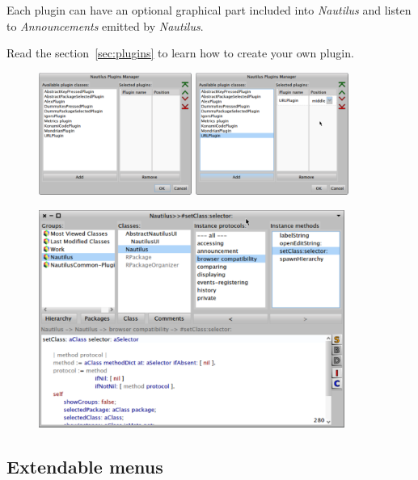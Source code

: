 \documentclass[a4paper,10pt,twoside]{book}
\newcommand\nautilus{\emph{Nautilus}\xspace}
\begin{document}
Each plugin can have an optional graphical part included into \nautilus and listen to \emph{Announcements} emitted by \nautilus.

Read the section~\ref{sec:plugins} to learn how to create your own plugin.

\begin{figure}[ht]
\begin{center}
	\includegraphics[width=5cm]{figures/plugin1}
	\label{fig:plugin1}
	\includegraphics[width=5cm]{figures/plugin2}
	\label{fig:plugin2}
\end{center}
\begin{center}
	\includegraphics[width=10cm]{figures/plugin3}
	\label{fig:plugin3}
\end{center}
\end{figure}
\newpage

\subsection*{Extendable menus}
\end{document}
